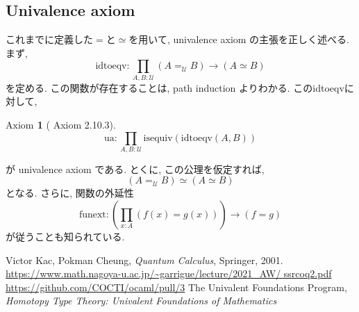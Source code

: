 \documentclass[11pt]{jarticle}
\theoremstyle{mystyle}
\newtheorem{axi}[df]{$\textrm{Axiom}$}
\newcommand{\U}{\mathcal{U}}
\newcommand{\iseq}{\textrm{isequiv}}
\newcommand{\0}{\textbf{0}}
\newcommand{\1}{\textbf{1}}
\newcommand{\2}{\textbf{2}}
\begin{document}
\subsection{Univalence axiom}
これまでに定義した$=$と$\simeq$を用いて, univalence axiom の主張を正しく述べる. まず, 
\[
  \textrm{idtoeqv} : \prod_{A, B : \U} (A =_{\U} B) \to (A \simeq B)
\]
を定める. この関数が存在することは, path induction よりわかる. このidtoeqvに対して, 
\begin{shadebox}
\begin{axi}[\cite{hott} Axiom 2.10.3]
  \[
    \textrm{ua} : \prod_{A, B : \U} \iseq(\textrm{idtoeqv}(A, B))
  \]
\end{axi}
\end{shadebox}
が univalence axiom である. とくに, この公理を仮定すれば, 
\[
  (A =_{\U} B) \simeq (A \simeq B)
\]
となる. さらに, 関数の外延性
\[
  \textrm{funext} : \left( \prod_{x : A} (f(x) = g(x)) \right) \to (f = g)
\]
が従うことも知られている. 
\begin{thebibliography}{9}
   Victor Kac, Pokman Cheung, {\it{Quantum Calculus}}, Springer, 2001.
   \url{https://www.math.nagoya-u.ac.jp/~garrigue/lecture/2021_AW/                  
                           ssrcoq2.pdf}
   \url{https://github.com/COCTI/ocaml/pull/3}
   The Univalent Foundations Program, 
                      {\it{Homotopy Type Theory: Univalent Foundations of Mathematics}}
\end{thebibliography}
\end{document}
